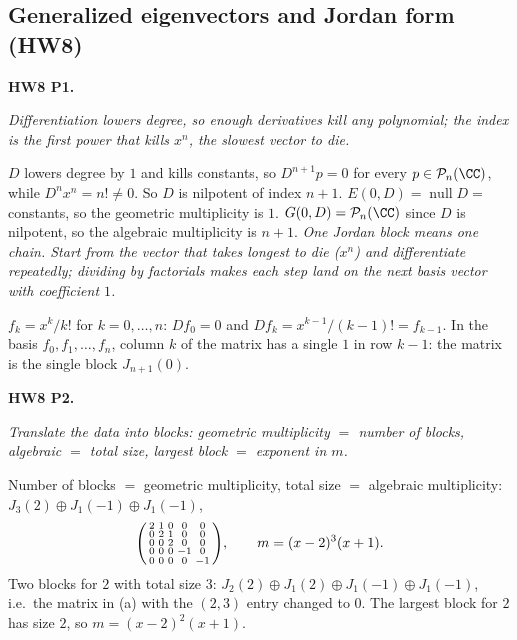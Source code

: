 \documentclass[10pt]{scrartcl}
\DeclareMathOperator{\nul}{null}
\newcommand{\PP}{\mathcal P}
\newcommand{\idea}[1]{{\color{OliveGreen!75!black}\textbf{Idea.}} \textit{#1}\par}
\newenvironment{prob}{\par\medskip\noindent\begin{minipage}{\linewidth}\setlength{\parskip}{3pt}}{\end{minipage}\par}
\begin{document}
\subsection{Generalized eigenvectors and Jordan form (HW8)}

\begin{prob}
\textbf{HW8 P1. }\par 
\begin{enumerate}[(a)]
  \ii \idea{Differentiation lowers degree, so enough derivatives kill any polynomial; the index is the first power that kills $x^n$, the slowest vector to die.}$D$ lowers degree by $1$ and kills constants, so $D^{n+1}p=0$ for every $p\in\PP_n(\CC)$, while $D^nx^n=n!\ne0$. So $D$ is nilpotent of index $n+1$.
  \ii $E(0,D)=\nul D=$ constants, so the geometric multiplicity is $1$. $G(0,D)=\PP_n(\CC)$ since $D$ is nilpotent, so the algebraic multiplicity is $n+1$.
  \ii \idea{One Jordan block means one chain. Start from the vector that takes longest to die ($x^n$) and differentiate repeatedly; dividing by factorials makes each step land on the next basis vector with coefficient $1$.}$f_k=x^k/k!$ for $k=0,\dots,n$: $Df_0=0$ and $Df_k=x^{k-1}/(k-1)!=f_{k-1}$. In the basis $f_0,f_1,\dots,f_n$, column $k$ of the matrix has a single $1$ in row $k-1$: the matrix is the single block $J_{n+1}(0)$.
\end{enumerate}
\end{prob}

\begin{prob}
\textbf{HW8 P2. }\par 
\begin{enumerate}[(a)]
  \ii \idea{Translate the data into blocks: geometric multiplicity $=$ number of blocks, algebraic $=$ total size, largest block $=$ exponent in $m$.}Number of blocks $=$ geometric multiplicity, total size $=$ algebraic multiplicity: $J_3(2)\oplus J_1(-1)\oplus J_1(-1)$,
  \[ \begin{psmallmatrix}2&1&0&0&0\\0&2&1&0&0\\0&0&2&0&0\\0&0&0&-1&0\\0&0&0&0&-1\end{psmallmatrix},\qquad m=(x-2)^3(x+1). \]
  \ii Two blocks for $2$ with total size $3$: $J_2(2)\oplus J_1(2)\oplus J_1(-1)\oplus J_1(-1)$, i.e.\ the matrix in (a) with the $(2,3)$ entry changed to $0$. The largest block for $2$ has size $2$, so $m=(x-2)^2(x+1)$.
\end{enumerate}
\end{prob}
\end{document}
